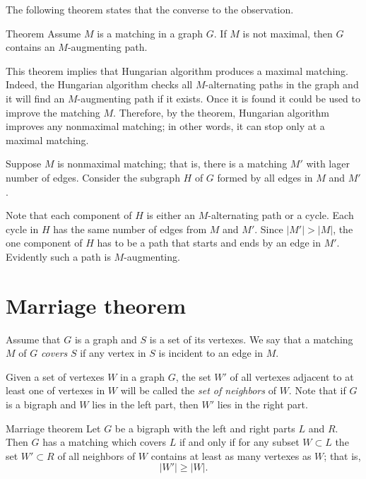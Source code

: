 The following theorem states that the converse to the observation.

\begin{thm}{Theorem}
Assume $M$ is a matching in a graph $G$.
If $M$ is not maximal, then $G$ contains an $M$-augmenting path.
\end{thm}

This theorem implies that Hungarian algorithm \cite[Section 7.2]{hartsfield-ringel} produces a maximal matching.
Indeed, the Hungarian algorithm checks all $M$-alternating paths in the graph and it will find an $M$-augmenting path if it exists.
Once it is found it could be used to improve the matching $M$.
Therefore, by the theorem, Hungarian algorithm improves any nonmaximal matching;
in other words, it can stop only at a maximal matching.

Suppose $M$ is nonmaximal matching; that is, there is a matching $M'$ with lager number of edges.
Consider the subgraph $H$ of $G$ formed by all edges in $M$ and $M'$.

Note that each component of $H$ is either an $M$-alternating path or a cycle.
Each cycle in $H$ has the same number of edges from $M$ and $M'$.
Since $|M'|>|M|$, the one component of $H$ has to be a path that starts and ends by an edge in $M'$.
Evidently such a path is $M$-augmenting.
\qeds

\section*{Marriage theorem}

Assume that $G$ is a graph and $S$ is a set of its vertexes.
We say that a matching $M$ of $G$ {}\emph{covers} $S$ if any vertex in $S$ is incident to an edge in $M$.

Given a set of vertexes $W$ in a graph $G$, the set $W'$ of all vertexes  adjacent to at least one of vertexes in $W$ will be called the \emph{set of neighbors} of $W$.
Note that if $G$ is a bigraph and $W$ lies in the left part, then $W'$ lies in the right part. 

\begin{thm}{Marriage theorem}
Let $G$ be a bigraph with the left and right parts $L$ and $R$.
Then $G$ has a matching which covers $L$ if and only if for any subset $W\subset L$ the set $W'\subset R$ of all neighbors of $W$ contains at least as many vertexes as $W$; that is, 
\[|W'|\ge |W|.\] 

\end{thm}

